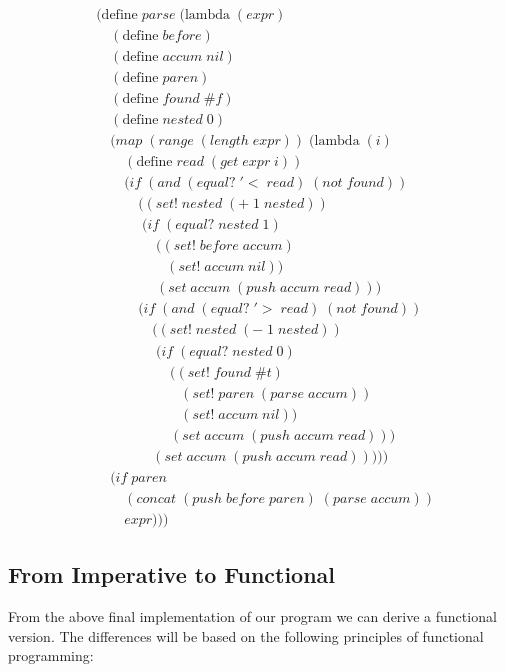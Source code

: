 \clearpage
\begin{figure}[ht]
\caption{}\label{scheme}
\begin{align*}
& (\text{define} \; parse \; (\text{lambda} \; (expr) \; 
\\& \quad (\text{define} \; before)
\\& \quad (\text{define} \; accum \; nil)
\\& \quad (\text{define} \; paren)
\\& \quad (\text{define} \; found \; \#f)
\\& \quad (\text{define} \; nested \; 0)
\\& \quad (map \; (range \; (length \; expr)) \; (\text{lambda} \; (i)
\\& \qquad (\text{define} \; read \; (get \; expr \; i))
\\& \qquad (if \; (and \; (equal? \; '< \; read) \; (not \; found))
\\& \qquad \quad ((set! \; nested \; (+ \; 1 \; nested))
\\& \qquad \quad \; (if \; (equal? \; nested \; 1)
\\& \qquad \qquad \; ((set! \; before \; accum)
\\& \qquad \qquad \quad (set! \; accum \; nil))
\\& \qquad \qquad \; (set \; accum \; (push \; accum \; read)))
\\& \qquad \quad (if \; (and \; (equal? \; '> \; read) \; (not \; found))
\\& \qquad \qquad ((set! \; nested \; (- \; 1 \; nested))
\\& \qquad \qquad \; (if \; (equal? \; nested \; 0)
\\& \qquad \qquad \quad \; ((set! \; found \; \#t)
\\& \qquad \qquad \qquad (set! \; paren \; (parse \; accum))
\\& \qquad \qquad \qquad (set! \; accum \; nil))
\\& \qquad \qquad \quad \; (set \; accum \; (push \; accum \; read)))
\\& \qquad \qquad (set \; accum \; (push \; accum \; read)))))
\\& \quad (if \; paren
\\& \qquad (concat \; (push \; before \; paren) \; (parse \; accum))
\\& \qquad expr)))
\end{align*}
\end{figure}

\subsection{From Imperative to Functional}
From the above final implementation of our program we can derive a functional 
version. The differences will be based on the following principles of functional 
programming:

